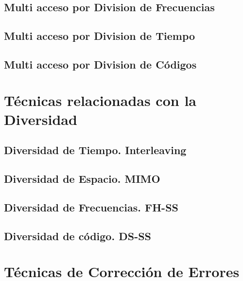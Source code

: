 \subsection{Multi acceso por Division de Frecuencias}
\subsection{Multi acceso por Division de Tiempo}
\subsection{Multi acceso por Division de Códigos}

\section{Técnicas relacionadas con la Diversidad}
\subsection{Diversidad de Tiempo. Interleaving}
\subsection{Diversidad de Espacio. MIMO}
\subsection{Diversidad de Frecuencias. FH-SS}
\subsection{Diversidad de código. DS-SS}

\section{Técnicas de Corrección de Errores}